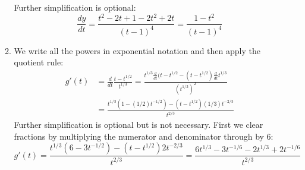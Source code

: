 \documentclass{article}
\begin{document}
\begin{enumerate}
\begin{enumerate}
    Further simplification is optional:
    \begin{equation*}
      \frac{dy}{dt} = \frac{t^2-2t+1-2t^2+2t}{(t-1)^4}
      = \frac{1-t^2}{(t-1)^4}
    \end{equation*}
  \item We write all the powers in exponential notation and then
    apply the quotient rule:
    \begin{align*}
      g'(t) 
      &= \frac{d}{dt} \frac{t-t^{1/2}}{t^{1/3}}
      = \frac{t^{1/3} \frac{d}{dt} (t-t^{1/2}- (t-t^{1/2})\frac{d}{dt} t^{1/3}}{
        (t^{1/3})^2}
      \\
      &= \frac{t^{1/3} (1-(1/2)t^{-1/2}) - (t-t^{1/2}) (1/3) t^{-2/3}}{t^{2/3}}
    \end{align*}
    Further simplification is optional but is not necessary.  First we clear
    fractions by multiplying the numerator and denominator through by $6$:
    \begin{equation*}
      g'(t) = \frac{t^{1/3} (6-3t^{-1/2}) - (t-t^{1/2}) 2 t^{-2/3}}{t^{2/3}}
      = \frac{6t^{1/3} - 3t^{-1/6} - 2t^{1/3}+2t^{-1/6}}{t^{2/3}}
    \end{equation*}
  \end{enumerate}

\end{enumerate}
\end{document}
